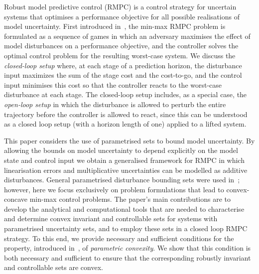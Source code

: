 \documentclass[journal]{IEEEtran}
\theoremstyle{remark}
\theoremstyle{definition}
\begin{document}
Robust model predictive control (RMPC) is a control strategy for uncertain systems that optimises a 
performance objective for all possible realisations of model uncertainty.
%
First introduced in~\cite{Witsenhausen:1968}, the min-max RMPC problem is formulated as a sequence of games in which an adversary maximises the effect of model disturbances on a performance objective, and the controller solves the optimal
control problem for the resulting worst-case system.
%
We discuss the \emph{closed-loop setup} where, at each stage of a prediction horizon, the disturbance input maximizes the sum of the stage cost and the cost-to-go, and the control input minimises this cost so that the controller reacts to the worst-case disturbance at each stage.
%
The closed-loop setup includes, as a special case, the \emph{open-loop setup} in which the disturbance is allowed to perturb the 
entire trajectory before the controller is allowed to react, since this can be understood as a closed loop setup (with a horizon length of one) applied to a lifted system.
%

This paper considers the use of parametrised sets to bound model uncertainty. By allowing the bounds on model uncertainty to depend explicitly on the model state and control input we obtain a generalised framework for RMPC in which linearisation errors and multiplicative uncertainties can be modelled as additive disturbances.
%
General parametrised disturbance bounding sets were used in~\cite{Rakovic03,Rakovic06}; however, here we focus exclusively on problem formulations that lead to convex-concave min-max control problems.
% 
The paper's main contributions are to develop
the analytical and computational tools that are needed to characterise and determine convex invariant and controllable sets for systems with parametrised uncertainty sets, and to employ these sets in a closed loop RMPC strategy. To this end, we provide necessary and sufficient conditions for the property, introduced in~\cite{Schaich:CDC:2015}, of \emph{parametric convexity}. We show that this condition is both necessary and sufficient to ensure that the corresponding robustly invariant and controllable sets are convex.
\end{document}
